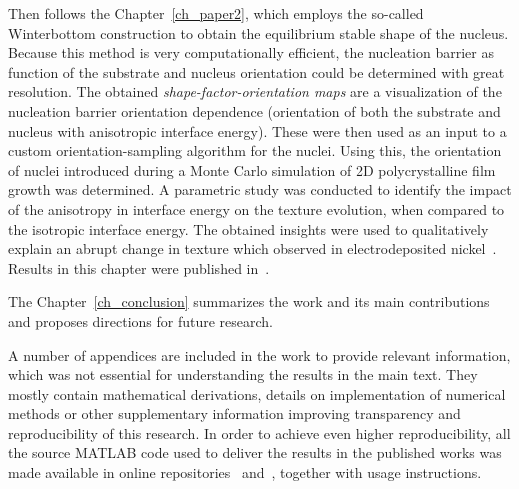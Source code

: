 Then follows the Chapter~\ref{ch_paper2}, which employs the so-called Winterbottom construction to obtain the equilibrium stable shape of the nucleus. Because this method is very computationally efficient, the nucleation barrier as function of the substrate and nucleus orientation could be determined with great resolution. The obtained \textit{shape-factor-orientation maps} are a visualization of the nucleation barrier orientation dependence (orientation of both the substrate and nucleus with anisotropic interface energy). These were then used as an input to a custom orientation-sampling algorithm for the nuclei. Using this, the orientation of nuclei introduced during a Monte Carlo simulation of 2D polycrystalline film growth was determined. A parametric study was conducted to identify the impact of the anisotropy in interface energy on the texture evolution, when compared to the isotropic interface energy. The obtained insights were used to qualitatively explain an abrupt change in texture which observed in electrodeposited nickel~\cite{Alimadadi2016}. Results in this chapter were published in~\cite{Minar2024}. 

The Chapter~\ref{ch_conclusion} summarizes the work and its main contributions and proposes directions for future research.

A number of appendices are included in the work to provide relevant information, which was not essential for understanding the results in the main text. They mostly contain mathematical derivations, details on implementation of numerical methods or other supplementary information improving transparency and reproducibility of this research. In order to achieve even higher reproducibility, all the source MATLAB code used to deliver the results in the published works was made available in online repositories~\cite{Minar2022dataset} and~\cite{Minar2023dataset}, together with usage instructions.




%


